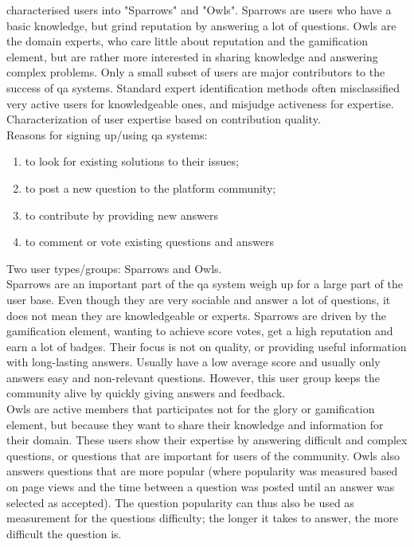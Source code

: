 \citet{Yang2014} characterised users into "Sparrows" and "Owls". Sparrows are users who have a basic knowledge, but grind reputation by answering a lot of questions. 
Owls are the domain experts, who care little about reputation and the gamification element, but are rather more interested in sharing knowledge and answering complex problems. 
Only a small subset of users are major contributors to the success of \gls{qa} systems. 
Standard expert identification methods often misclassified very active users for knowledgeable ones, and misjudge activeness for expertise. 
Characterization of user expertise based on contribution quality.  \\
Reasons for signing up/using qa systems:  \\
\begin{enumerate}
	\item to look for existing solutions to their issues;
	\item to post a new question to the platform community;
	\item to contribute by providing new answers
	\item to comment or vote existing questions and answers
\end{enumerate}
Two user types/groups: Sparrows and Owls. \\
Sparrows are an important part of the \gls{qa} system weigh up for a large part of the user base. 
Even though they are very sociable and answer a lot of questions, it does not mean they are knowledgeable or experts.
Sparrows are driven by the gamification element, wanting to achieve score votes, get a high reputation and earn a lot of badges. 
Their focus is not on quality, or providing useful information with long-lasting answers. Usually have a low average score and usually only answers easy and non-relevant questions. 
However, this user group keeps the community alive by quickly giving answers and feedback.  \\
Owls are active members that participates not for the glory or gamification element, but because they want to share their knowledge and information for their domain. 
These users show their expertise by answering difficult and complex questions, or questions that are important for users of the community. 
Owls also answers questions that are more popular (where popularity was measured based on page views and the time between a question was posted until an answer was selected as accepted).
The question popularity can thus also be used as measurement for the questions difficulty; the longer it takes to answer, the more difficult the question is. \\
